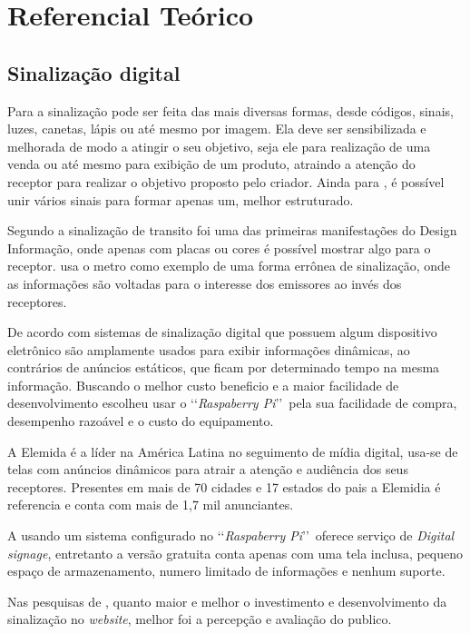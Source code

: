 \chapter[Referencial Teórico]{Referencial Teórico}

\section{Sinalização digital}
Para \cite{munari2006} a sinalização pode ser feita das mais diversas formas, desde códigos, sinais, luzes, canetas, lápis ou até mesmo por imagem. Ela deve ser sensibilizada e melhorada de modo a  atingir o seu objetivo, seja ele para realização de uma venda ou até mesmo para exibição de um produto, atraindo a atenção do receptor para realizar o objetivo proposto pelo criador. Ainda para \cite{munari2006}, é possível unir vários sinais para formar apenas um, melhor estruturado.

Segundo \cite{redig2004} a sinalização de transito foi uma das primeiras manifestações do Design Informação, onde apenas com placas ou cores é possível mostrar algo para o receptor. \cite{redig2004} usa o metro como exemplo de uma forma errônea de sinalização, onde as informações são voltadas para o interesse dos emissores ao invés dos receptores. 

De acordo com \cite{mishima2016} sistemas de sinalização digital que possuem algum dispositivo eletrônico são amplamente usados para exibir informações dinâmicas, ao contrários de anúncios estáticos, que ficam por determinado tempo na mesma informação. Buscando o melhor custo beneficio e a maior facilidade de desenvolvimento \cite{mishima2016} escolheu usar o \lq\lq \textit{Raspaberry Pi}\rq\rq\ pela sua facilidade de compra, desempenho razoável e o custo do equipamento.

A Elemida é a líder na América Latina no seguimento de mídia digital, usa-se de telas com anúncios dinâmicos para atrair a atenção e audiência dos seus receptores. Presentes em mais de 70 cidades e 17 estados do pais a Elemidia é referencia e conta com mais de 1,7 mil anunciantes. \cite{elemidia2017}

A \cite{screenly2017} usando um sistema configurado no \lq\lq\textit{Raspaberry Pi}\rq\rq\ oferece serviço de \textit{Digital signage}, entretanto a versão gratuita conta apenas com uma tela inclusa, pequeno espaço de armazenamento, numero limitado de informações e nenhum suporte.

Nas pesquisas de \cite{brambilla2017}, quanto maior e melhor o investimento e desenvolvimento da sinalização no \textit{website}, melhor foi a percepção e avaliação do publico.